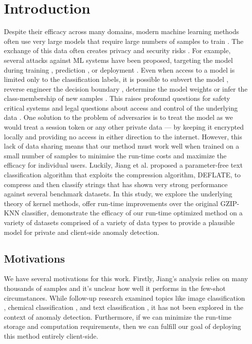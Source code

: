 \documentclass[conference]{IEEEtran}
\begin{document}
\section{Introduction}

Despite their efficacy across many domains, modern machine learning methods often use very large models that require large numbers of samples to train \cite{desislavov2021compute}. The exchange of this data often creates privacy and security risks \cite{}. For example, several attacks against ML systems have been proposed, targeting the model during training \cite{biggio_poisoning_2013}, prediction \cite{biggio_evasion_2013,deepfool,carlini_towards_2017}, or deployment \cite{distributed_attacks,santos2021universal}. Even when access to a model is limited only to the classification labels, it is possible to subvert the model \cite{hopskipjump}, reverse engineer the decision boundary \cite{deepfool}, determine the model weights \cite{jagielski2020high} or infer the class-membership of new samples \cite{bentley2020quantifying}. This raises profound questions for safety critical systems \cite{meyers} and legal questions about access and control of the underlying data \cite{mitrou2018data,marks2023ai}. One solution to the problem of adversaries is to treat the model as we would treat a session token or any other private data --- by keeping it encrypted locally and providing no access in either direction to the internet. However, this lack of data sharing means that our method must work well when trained on a small number of samples to minimise the run-time costs and maximize the efficacy for individual users.  Luckily, Jiang et al.\cite{jiang2022less} proposed a parameter-free text classification algorithm that exploits the compression algorithm, DEFLATE, to compress and then classify strings that has shown very strong performance against several benchmark datasets. In this study, we explore the underlying theory of kernel methods, offer run-time improvements over the original\cite{jiang2022less} GZIP-KNN classifier, demonstrate the efficacy of our run-time optimized method on a variety of datasets comprised of a variety of data types to provide a plausible model for private and client-side anomaly detection.  

\subsection{Motivations}
 We have several motivations for this work. Firstly, Jiang's analysis relies on many thousands of samples and it's unclear how well it performs in the few-shot circumstances. While follow-up research examined topics like image classification \cite{opitz2023gzip}, chemical classification \cite{weinreich2023parameter}, and text classification \cite{nishida2011tweet}, it has not been explored in the context of anomaly detection. Furthermore, if we can minimize the run-time storage and computation requirements, then we can fulfill our goal of deploying this method entirely client-side.
\end{document}
